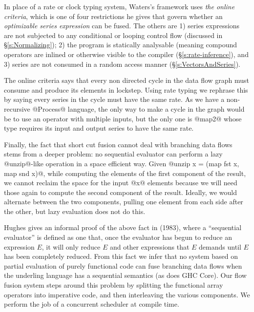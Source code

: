 In place of a rate or clock typing system, Waters's framework uses \emph{the online criteria}, which is one of four restrictions he gives that govern whether an \emph{optimizable series expression} can be fused. The others are 1) series expressions are not subjected to any conditional or looping control flow (discussed in \S\ref{s:Normalizing}); 2) the program is statically analysable (meaning compound operators are inlined or otherwise visible to the compiler (\S\ref{s:rate-inference}), and 3) series are not consumed in a random access manner (\S\ref{s:VectorsAndSeries}). 

The online criteria says that every non directed cycle in the data flow graph must consume and produce its elements in lockstep. Using rate typing we rephrase this by saying every series in the cycle must have the same rate. As we have a non-recursive @Process@ language, the only way to make a cycle in the graph would be to use an operator with multiple inputs, but the only one is @map2@ whose type requires its input and output series to have the same rate.

Finally, the fact that short cut fusion cannot deal with branching data flows stems from a deeper problem: no sequential evaluator can perform a lazy @unzip@-like operation in a space efficient way. Given @unzip x = (map fst x, map snd x)@, while computing the elements of the first component of the result, we cannot reclaim the space for the input @x@ elements because we will need those again to compute the second component of the result. Ideally, we would alternate between the two components, pulling one element from each side after the other, but lazy evaluation does not do this.

Hughes gives an informal proof of the above fact in \cite{Hughes:thesis} (1983), where a ``sequential evaluator'' is defined as one that, once the evaluator has begun to reduce an expression $E$, it will only reduce $E$ and other expressions that $E$ demands until $E$ has been completely reduced. From this fact we infer that no system based on partial evaluation of purely functional code can fuse branching data flows when the underling language has a sequential semantics (as does GHC Core). Our flow fusion system steps around this problem by splitting the functional array operators into imperative code, and then interleaving the various components. We perform the job of a concurrent scheduler at compile time.

